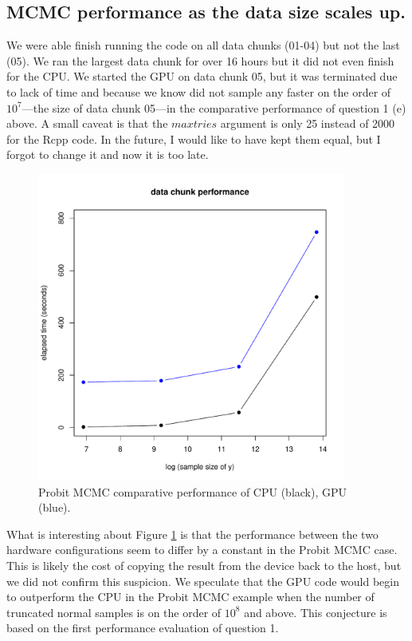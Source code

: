 \documentclass[11pt]{amsart}
\begin{document}
\newpage 

\subsection{MCMC performance as the data size scales up.}

We were able finish running the code on all data chunks (01-04) but not the last (05). We ran the largest data chunk for over 16 hours but it did not even finish for the CPU. We started the GPU on data chunk 05, but it was terminated due to lack of time and because we know did not sample any faster on the order of $10^7$---the size of data chunk 05---in the comparative performance of question 1 (e) above. A small caveat is that the $maxtries$ argument is only 25 instead of 2000 for the Rcpp code. In the future, I would like to have kept them equal, but I forgot to change it and now it is too late. 

\begin{figure}[htbp] %
   \centering
   \includegraphics[width=4in]{../data_chunk_performance.pdf} 
   \caption{Probit MCMC comparative performance of CPU (black), GPU (blue). }
   \label{fig:mcmc_profile}
\end{figure}

What is interesting about Figure \ref{fig:mcmc_profile} is that the performance between the two hardware configurations seem to differ by a constant in the Probit MCMC case. This is likely the cost of copying the result from the device back to the host, but we did not confirm this suspicion.  We speculate that the GPU code would begin to outperform the CPU in the Probit MCMC example when the number of truncated normal samples is on the order of $10^8$ and above. This conjecture is based on the first performance evaluation of question 1. 
\end{document}
